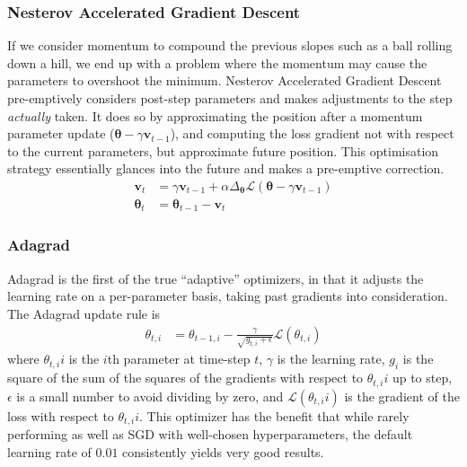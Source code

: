 \documentclass{report}
\begin{document}
\subsubsection{Nesterov Accelerated Gradient Descent} \label{nesterov}
If we consider momentum to compound the previous slopes such as a ball rolling down a hill, we end up with a problem where the momentum may cause the parameters to overshoot the minimum. Nesterov Accelerated Gradient Descent \parencite{nesterov} pre-emptively considers post-step parameters and makes adjustments to the step \textit{actually} taken. It does so by approximating the position after a momentum parameter update ($\bm{\theta} - \gamma\bm{v}_{t-1}$), and computing the loss gradient not with respect to the current parameters, but approximate future position. This optimisation strategy essentially glances into the future and makes a pre-emptive correction.
\begin{align}
 \bm{v}_t      & = \gamma \bm{v}_{t-1} + \alpha \Delta_{\bm{\theta}} \mathcal{L}(\bm{\theta} - \gamma\bm{v}_{t-1}) \\
 \bm{\theta}_t & = \bm{\theta}_{t-1} - \bm{v}_t
\end{align}

\subsubsection{Adagrad}
Adagrad \parencite{adagrad} is the first of the true ``adaptive'' optimizers, in that it adjusts the learning rate on a per-parameter basis, taking past gradients into consideration. The Adagrad update rule is
\begin{align} \label{adagrad:1}
 \theta_{t, i} & = \theta_{t-1, i} - \frac{\gamma}{\sqrt{g_{t, i} + \epsilon}} \mathcal{L}(\theta_{t, i})
\end{align}
where $\theta_{t,i}i$ is the $i$th parameter at time-step $t$, $\gamma$ is the learning rate, $g_i$ is the square of the sum of the squares of the gradients with respect to $\theta_{t,i}i$ up to step, $\epsilon$ is a small number to avoid dividing by zero, and $\mathcal{L}(\theta_{t,i}i)$ is the gradient of the loss with respect to $\theta_{t,i}i$. This optimizer has the benefit that while rarely performing as well as SGD with well-chosen hyperparameters, the default learning rate of $0.01$ consistently yields very good results.
\end{document}
